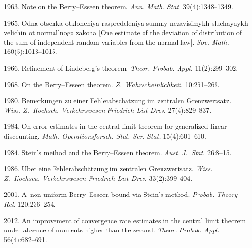   \begin{multicols}{2}

\renewcommand{\bibname}{\protect\rmfamily References}

{\small\frenchspacing
 {%
 \begin{thebibliography}{99}

 1963. Note on the Berry--Esseen theorem. 
\textit{Ann. Math. Stat.} 39(4):1348--1349.

 1965. Odna otsenka otkloneniya raspredeleniya summy
nezavisimykh sluchaynykh velichin ot normal'nogo zakona
[One estimate of the deviation of distribution of the sum of independent
random variables from the normal law]. 
\textit{Sov. Math.} 160(5):1013--1015.

 1966. Refinement of Lindeberg's theorem. 
\textit{Theor. Probab. Appl.} 11(2):299--302.

 1968. On the Berry--Esseen theorem. 
\textit{Z.~Wahrscheinlichkeit.} 10:261--268.

 1980. Bemerkungen zu einer Fehlerabsch$\ddot{\mbox{a}}$tzung 
im zentralen Grenzwertsatz. \textit{Wiss. Z.~Hochsch. 
 Verkehrswesen Friedrich List Dres.} 27(4):829--837.

 1984. On error-estimates in the central limit theorem for
generalized linear discounting. \textit{Math. Operationsforsch. 
Stat. Ser. Stat.} 15(4):601--610.



 1984. Stein's method and the Berry--Esseen
theorem. \textit{Aust. J.~Stat}. 26:8--15.

 1986. $\ddot{\mbox{U}}$ber eine Fehlerabsch{\"a}tzung im zentralen
Grenzwertsatz. \textit{Wiss. Z.~Hochsch. Verkehrswesen
Friedrich List Dres.} 33(2):399--404.

 2001. A~non-uniform Berry--Esseen bound via
Stein's method. \textit{Probab. Theory Rel.} 120:236--254.

2012. An improvement of convergence rate estimates 
in the central limit theorem under absence of moments higher than the
second. 
\textit{Theor. Probab. Appl.} 56(4):682--691.


\end{thebibliography}}}
\end{multicols}
